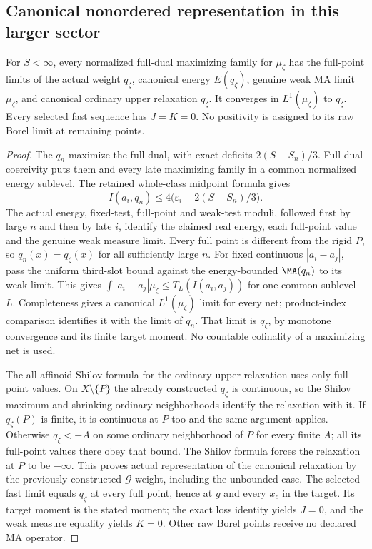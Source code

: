 \subsection{Canonical nonordered representation in this larger sector}
\begin{theorem}\label{branch:recognition}
For $S<\infty$, every normalized full-dual maximizing family for
$\mu_\zeta$ has the full-point limits of the actual weight $q_\zeta$,
canonical energy $E(q_\zeta)$, genuine weak MA limit $\mu_\zeta$, and
canonical ordinary upper relaxation $q_\zeta$. It converges in
$L^1(\mu_\zeta)$ to $q_\zeta$. Every selected fast sequence has $J=K=0$.
No positivity is assigned to its raw Borel limit at remaining points.
\end{theorem}
\begin{proof}
The $q_n$ maximize the full dual, with exact deficits
$2(S-S_n)/3$. Full-dual coercivity puts them and every late maximizing
family in a common normalized energy sublevel. The retained whole-class
midpoint formula gives
\[
 I(a_i,q_n)\le4\bigl(\varepsilon_i+2(S-S_n)/3\bigr).
\]
The actual energy, fixed-test, full-point and weak-test moduli, followed
first by large $n$ and then by late $i$, identify the claimed real energy,
each full-point value and the genuine weak measure limit. Every full point
is different from the rigid $P$, so $q_n(x)=q_\zeta(x)$ for all sufficiently
large $n$. For fixed continuous $|a_i-a_j|$, pass the uniform third-slot
bound against the energy-bounded $\MA(q_n)$ to its weak limit. This gives
$\int|a_i-a_j|\mu_\zeta\le T_L(I(a_i,a_j))$ for one common sublevel $L$.
Completeness gives a canonical $L^1(\mu_\zeta)$ limit for every net;
product-index comparison identifies it with the limit of $q_n$.
That limit is $q_\zeta$, by monotone convergence and its finite target
moment. No countable cofinality of a maximizing net is used.

The all-affinoid Shilov formula for the ordinary upper relaxation uses
only full-point values. On $X\setminus\{P\}$ the already constructed
$q_\zeta$ is continuous, so the Shilov maximum and shrinking ordinary
neighborhoods identify the relaxation with it. If $q_\zeta(P)$ is finite,
it is continuous at $P$ too and the same argument applies. Otherwise
$q_\zeta<-A$ on some ordinary neighborhood of $P$ for every finite $A$;
all its full-point values there obey that bound. The Shilov formula
forces the relaxation at $P$ to be $-\infty$. This proves actual
representation of the canonical relaxation by the previously constructed
$\mathcal G$ weight, including the unbounded case.
The selected fast limit equals $q_\zeta$ at every full point, hence at
$g$ and every $x_c$ in the target. Its target moment is the stated moment;
the exact loss identity yields $J=0$, and the weak measure equality yields
$K=0$. Other raw Borel points receive no declared MA operator.
\end{proof}

